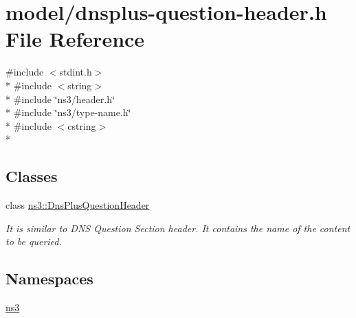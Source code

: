 \hypertarget{dnsplus-question-header_8h}{\section{model/dnsplus-\/question-\/header.h File Reference}
\label{dnsplus-question-header_8h}
}
{\ttfamily \#include $<$stdint.\-h$>$}\\*
{\ttfamily \#include $<$string$>$}\\*
{\ttfamily \#include \char`\"{}ns3/header.\-h\char`\"{}}\\*
{\ttfamily \#include \char`\"{}ns3/type-\/name.\-h\char`\"{}}\\*
{\ttfamily \#include $<$cstring$>$}\\*
\subsection*{Classes}
\begin{DoxyCompactItemize}
\item 
class \hyperlink{classns3_1_1DnsPlusQuestionHeader}{ns3\-::\-Dns\-Plus\-Question\-Header}
\begin{DoxyCompactList}\small\item\em It is similar to D\-N\-S Question Section header. It contains the name of the content to be queried. \end{DoxyCompactList}\end{DoxyCompactItemize}
\subsection*{Namespaces}
\begin{DoxyCompactItemize}
\item 
\hyperlink{namespacens3}{ns3}
\end{DoxyCompactItemize}
